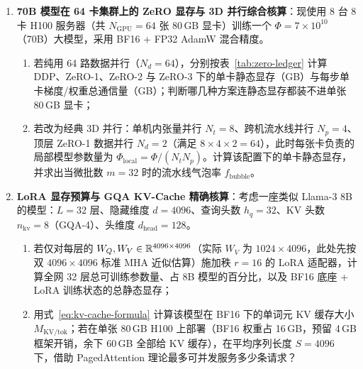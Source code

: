 \begin{enumerate}
  \item[\textbf{6.6.1}] \textbf{70B 模型在 64 卡集群上的 ZeRO 显存与 3D 并行综合核算}：现使用 8 台 8 卡 H100 服务器（共 $N_{\mathrm{GPU}} = 64$ 张 80\,GB 显卡）训练一个 $\Phi = 7\times 10^{10}$（70B）大模型，采用 BF16 + FP32 AdamW 混合精度。
  \begin{enumerate}
    \item 若纯用 64 路数据并行（$N_d = 64$），分别按表~\ref{tab:zero-ledger} 计算 DDP、ZeRO-1、ZeRO-2 与 ZeRO-3 下的单卡静态显存（GB）与每步单卡梯度/权重总通信量（GB）；判断哪几种方案连静态显存都装不进单张 80\,GB 显卡；
    \item 若改为经典 3D 并行：单机内张量并行 $N_t = 8$、跨机流水线并行 $N_p = 4$、顶层 ZeRO-1 数据并行 $N_d = 2$（满足 $8 \times 4 \times 2 = 64$），此时每张卡负责的局部模型参数量为 $\Phi_{\mathrm{local}} = \Phi / (N_t N_p)$。计算该配置下的单卡静态显存，并求出当微批数 $m = 32$ 时的流水线气泡率 $f_{\mathrm{bubble}}$。
  \end{enumerate}

  \item[\textbf{6.6.2}] \textbf{LoRA 显存预算与 GQA KV-Cache 精确核算}：考虑一座类似 Llama-3 8B 的模型：$L = 32$ 层、隐藏维度 $d = 4096$、查询头数 $h_q = 32$、KV 头数 $n_{\mathrm{kv}} = 8$（GQA-4）、头维度 $d_{\mathrm{head}} = 128$。
  \begin{enumerate}
    \item 若仅对每层的 $W_Q, W_V \in \mathbb{R}^{4096 \times 4096}$（实际 $W_V$ 为 $1024 \times 4096$，此处先按双 $4096 \times 4096$ 标准 MHA 近似估算）施加秩 $r = 16$ 的 LoRA 适配器，计算全网 32 层总可训练参数量、占 8B 模型的百分比，以及 BF16 底座 + LoRA 训练状态的总静态显存；
    \item 用式~\eqref{eq:kv-cache-formula} 计算该模型在 BF16 下的单词元 KV 缓存大小 $M_{\mathrm{KV/tok}}$；若在单张 80\,GB H100 上部署（BF16 权重占 16\,GB，预留 4\,GB 框架开销，余下 60\,GB 全部给 KV 缓存），在平均序列长度 $S = 4096$ 下，借助 PagedAttention 理论最多可并发服务多少条请求？
  \end{enumerate}
\end{enumerate}

